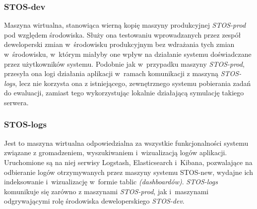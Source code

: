 \subsubsection{STOS-dev}
Maszyna wirtualna, stanowiąca wierną kopię maszyny produkcyjnej \textit{STOS-prod} pod względem środowiska. Służy ona testowaniu wprowadzanych przez zespół deweloperski zmian w~środowisku produkcyjnym bez wdrażania tych zmian w~środowisku, w~którym miałyby one wpływ na działanie systemu doświadczane przez użytkowników systemu. Podobnie jak w~przypadku maszyny \textit{STOS-prod}, przesyła ona logi działania aplikacji w~ramach komunikacji z maszyną \textit{STOS-logs}, lecz nie korzysta ona z istniejącego, zewnętrznego systemu pobierania zadań do ewaluacji, zamiast tego wykorzystując lokalnie działającą symulację takiego serwera.

\subsubsection{STOS-logs}
Jest to maszyna wirtualna odpowiedzialna za wszystkie funkcjonalności systemu związane z gromadzeniem, wyszukiwaniem i~wizualizacją logów aplikacji. Uruchomione są na niej serwisy Logstash, Elasticsearch i~Kibana, pozwalające na odbieranie logów otrzymywanych przez maszyny systemu STOS-new, wydajne ich indeksowanie i~wizualizację w~formie tablic \textit{(dashboardów)}. \textit{STOS-logs} komunikuje się zarówno z maszynami \textit{STOS-prod}, jak i~maszynami odgrywającymi rolę środowiska deweloperskiego \textit{STOS-dev}. 

